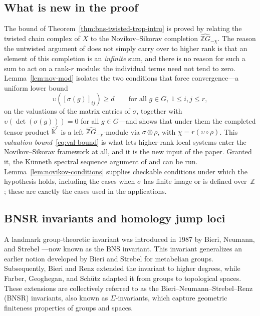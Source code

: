 \documentclass[11pt]{amsart}
\theoremstyle{definition}
\newcommand{\Z}{\mathbb{Z}}
\newcommand{\K}{\mathbb{K}}
\begin{document}
\subsection{What is new in the proof}
\label{intro:new}
The bound of Theorem~\ref{thm:bns-twisted-trop-intro} is proved by
relating the twisted chain complex of $X$ to the Novikov--Sikorav
completion $\widehat{\Z G}_{-\chi}$.  The reason the untwisted argument
of \cite{PS-plms,Su-mathann} does not simply carry over to higher rank
is that an element of this completion is an \emph{infinite}\/ sum, and
there is no reason for such a sum to act on a rank-$r$ module: the
individual terms need not tend to zero.  Lemma~\ref{lem:nov-mod}
isolates the two conditions that force convergence---a uniform lower
bound
\begin{equation*}
\upsilon([\sigma(g)]_{ij}) \ge d \qquad \text{for all } g\in G,\
1\le i,j\le r,
\end{equation*}
on the valuations of the matrix entries of $\sigma$, together with
$\upsilon(\det(\sigma(g)))=0$ for all $g\in G$---and shows that under
them the completed tensor product $\hat{\K}^r$ is a left
$\widehat{\Z G}_{-\chi}$-module via $\sigma\otimes \rho$, with
$\chi=r(\upsilon\circ \rho)$.  This \emph{valuation bound}~\eqref{eq:val-bound}
is what lets higher-rank local systems enter the Novikov--Sikorav
framework at all, and it is the new input of the paper.  Granted it, the
K\"{u}nneth spectral sequence argument of \cite[Thm.~10.1]{PS-plms} and
\cite[Thm.~6.4]{Su-mathann} can be run.
Lemma~\ref{lem:novikov-conditions} supplies checkable conditions under
which the hypothesis holds, including the cases when $\sigma$ has finite
image or is defined over~$\Z$; these are exactly the cases used in the
applications.

\subsection{BNSR invariants and homology jump loci}
\label{intro:BNSR}
A landmark group-theoretic invariant was introduced in 1987 by Bieri, Neumann,
and Strebel \cite{BNS}---now known as the BNS invariant. This invariant generalizes
an earlier notion developed by Bieri and Strebel \cite{BS80,BS81} for metabelian groups.
Subsequently, Bieri and Renz \cite{BR}  extended the invariant to higher degrees, while
Farber, Geoghegan, and Sch\"utz \cite{FGS} adapted it from groups to topological spaces.
These extensions are collectively referred to as the Bieri--Neumann--Strebel--Renz (BNSR)
invariants, also known as $\Sigma$-invariants, which capture geometric finiteness properties
of groups and spaces.
\end{document}
